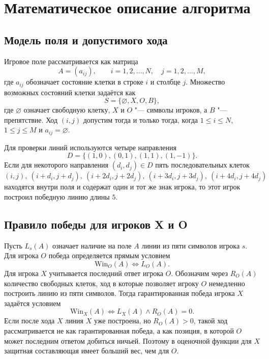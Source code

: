 \documentclass[a4paper,14pt]{extarticle}
\begin{document}
\clearpage
\section{Математическое описание алгоритма}

\subsection{Модель поля и допустимого хода}

Игровое поле рассматривается как матрица
\begin{equation}
A = (a_{ij}), \qquad i=1,2,\ldots,N, \quad j=1,2,\ldots,M,
\label{eq:board}
\end{equation}
где $a_{ij}$ обозначает состояние клетки в строке $i$ и столбце $j$. Множество возможных состояний клетки задаётся как
\begin{equation}
S = \{\varnothing, X, O, B\},
\label{eq:states}
\end{equation}
где $\varnothing$ означает свободную клетку, $X$ и $O$ "--- символы игроков, а $B$ "--- препятствие. Ход $(i,j)$ допустим тогда и только тогда, когда $1 \leq i \leq N$, $1 \leq j \leq M$ и $a_{ij}=\varnothing$.

Для проверки линий используются четыре направления
\begin{equation}
D = \{(1,0),(0,1),(1,1),(1,-1)\}.
\label{eq:directions}
\end{equation}
Если для некоторого направления $(d_i,d_j) \in D$ пять последовательных клеток
\[
(i,j),\ (i+d_i,j+d_j),\ (i+2d_i,j+2d_j),\ (i+3d_i,j+3d_j),\ (i+4d_i,j+4d_j)
\]
находятся внутри поля и содержат один и тот же знак игрока, то этот игрок построил победную линию длины $5$.

\subsection{Правило победы для игроков X и O}

Пусть $L_s(A)$ означает наличие на поле $A$ линии из пяти символов игрока $s$. Для игрока $O$ победа определяется прямым условием
\begin{equation}
\mathrm{Win}_O(A) \Longleftrightarrow L_O(A).
\label{eq:win_o}
\end{equation}
Для игрока $X$ учитывается последний ответ игрока $O$. Обозначим через $R_O(A)$ количество свободных клеток, ход в которые позволяет игроку $O$ немедленно построить линию из пяти символов. Тогда гарантированная победа игрока $X$ задаётся условием
\begin{equation}
\mathrm{Win}_X(A) \Longleftrightarrow L_X(A) \wedge R_O(A)=0.
\label{eq:win_x}
\end{equation}
Если после хода $X$ линия $X$ уже построена, но $R_O(A)>0$, такой ход рассматривается не как гарантированная победа, а как позиция, в которой $O$ может последним ответом добиться ничьей. Поэтому в оценочной функции для $X$ защитная составляющая имеет больший вес, чем для $O$.
\end{document}
